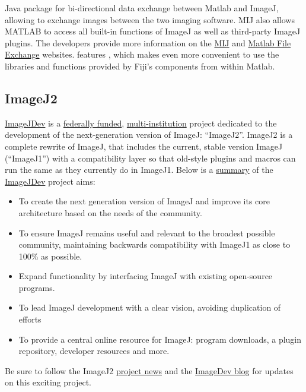 \begin{description}
Java package for bi-directional data exchange between Matlab
and ImageJ, allowing to exchange images between the two imaging software.
MIJ also allows MATLAB to
access all built-in functions of ImageJ as well as third-party ImageJ
plugins. The developers provide more information on the \href{http://bigwww.epfl.ch/sage/soft/mij/}{MIJ}
and \href{http://www.mathworks.com/matlabcentral/fileexchange/32344-hardware-accelerated-3d-viewer-for-matlab}{Matlab File Exchange}
websites.  features ,
which makes even more convenient to use the libraries and functions
provided by Fiji's components from within Matlab.
\end{description}



\subsection{ImageJ2\label{sub:ImageJ2intro}}

\href{http://imagejdev.org/}{ImageJDev} is a \href{http://imagejdev.org/funding}{federally funded},
\href{http://imagejdev.org/collaborators}{multi-institution} project
dedicated to the development of the next-generation version of ImageJ:
``ImageJ2''. ImageJ2
is a complete rewrite of ImageJ, that includes the current, stable
version ImageJ (``ImageJ1'') with a compatibility layer so that
old-style plugins and macros can run the same as they currently do
in ImageJ1. Below is a \href{http://imagejdev.org/aims}{summary}
of the \href{http://imagejdev.org/}{ImageJDev} project aims: 
\begin{itemize}
\item To create the next generation version of ImageJ and improve its core
architecture based on the needs of the community.
\item To ensure ImageJ remains useful and relevant to the broadest possible
community, maintaining backwards compatibility with ImageJ1 as close
to 100\% as possible.
\item Expand functionality by interfacing ImageJ with existing open-source
programs.
\item To lead ImageJ development with a clear vision, avoiding duplication
of efforts
\item To provide a central online resource for ImageJ: program downloads,
a plugin repository, developer resources and more.
\end{itemize}
Be sure to follow the ImageJ2 \href{http://imagejdev.org/recent_changes}{project news}
and the \href{http://imagejdev.org/blog}{ImageDev blog} for updates
on this exciting project.


